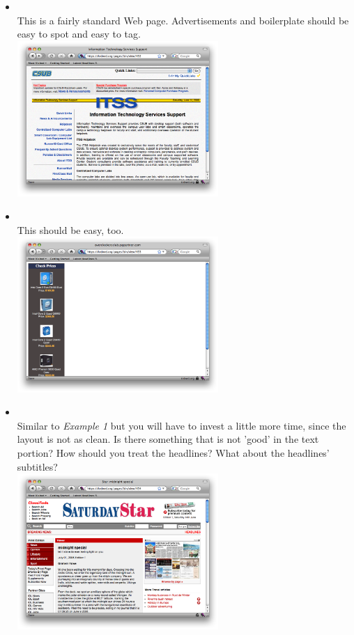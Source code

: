 \documentclass[12pt,a4paper]{article}
\begin{document}
\begin{itemize}
\item {} \\
This is a fairly standard Web page. Advertisements and boilerplate should be easy to spot and easy to tag.\\
\includegraphics[width=0.6\textwidth]{images/432.png} \\

\item {} \\
This should be easy, too. \\
\includegraphics[width=0.6\textwidth]{images/433.png} \\

\item {} \\
Similar to \emph{Example 1} but you will have to invest a little more time, since the layout is not as clean. Is there something that is not 'good' in the text portion? How should you treat the headlines? What about the headlines' subtitles? \\
\includegraphics[width=0.6\textwidth]{images/434.png} \\


\end{itemize}
\end{document}
